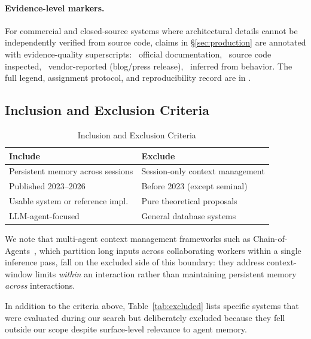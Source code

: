 \paragraph{Evidence-level markers.}
For commercial and closed-source systems where architectural details
cannot be independently verified from source code, claims in
\S\ref{sec:production} are annotated with evidence-quality superscripts:
\evD~official documentation, \evS~source code inspected,
\evV~vendor-reported (blog/press release),
\evI~inferred from behavior.
The full legend, assignment protocol, and reproducibility record are in
.

\subsection{Inclusion and Exclusion Criteria}

\begin{table}[htbp]
\centering
\caption{Inclusion and Exclusion Criteria}
\label{tab:criteria}
\begin{tabular}{@{}ll@{}}
\toprule
\textbf{Include} & \textbf{Exclude} \\
\midrule
Persistent memory across sessions & Session-only context management \\
Published 2023--2026 & Before 2023 (except seminal) \\
Usable system or reference impl. & Pure theoretical proposals \\
LLM-agent-focused & General database systems \\
\bottomrule
\end{tabular}
\end{table}

We note that multi-agent context management frameworks such as
Chain-of-Agents~\cite{zhang2024coa}, which partition long inputs across
collaborating workers within a single inference pass, fall on the
excluded side of this boundary: they address context-window limits
\emph{within} an interaction rather than maintaining persistent memory
\emph{across} interactions.

In addition to the criteria above, Table~\ref{tab:excluded} lists
specific systems that were evaluated during our search but deliberately
excluded because they fell outside our scope despite surface-level
relevance to agent memory.

